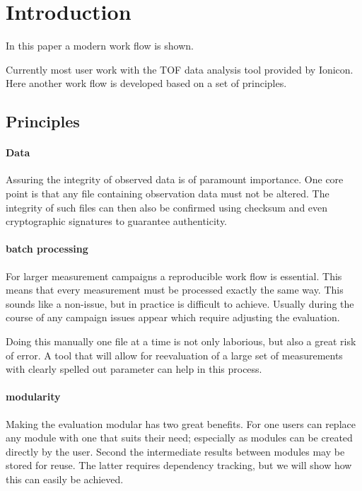 \section{Introduction}

In this paper a modern work flow is shown.

Currently most user work with the TOF data analysis tool
\citep{Muller2013a} provided by Ionicon.  Here another work flow is
developed based on a set of principles.

\subsection{Principles}

\paragraph{Data}

Assuring the integrity of observed data is of paramount importance.  One
core point is that any file containing observation data must not be
altered.  The integrity of such files can then also be confirmed using
checksum and even cryptographic signatures to guarantee authenticity.


\paragraph{batch processing}

For larger measurement campaigns a reproducible work flow is essential.
This means that every measurement must be processed exactly the same
way.  This sounds like a non-issue, but in practice is difficult to
achieve.  Usually during the course of any campaign issues appear which
require adjusting the evaluation.

Doing this manually one file at a time is not only laborious, but also a
great risk of error. A tool that will allow for reevaluation of a large
set of measurements with clearly spelled out parameter can help in this
process.


\paragraph{modularity}

Making the evaluation modular has two great benefits.  For one users can
replace any module with one that suits their need; especially as modules
can be created directly by the user. Second the intermediate
results between modules may be stored for reuse.  The latter requires
dependency tracking, but we will show how this can easily be achieved.

